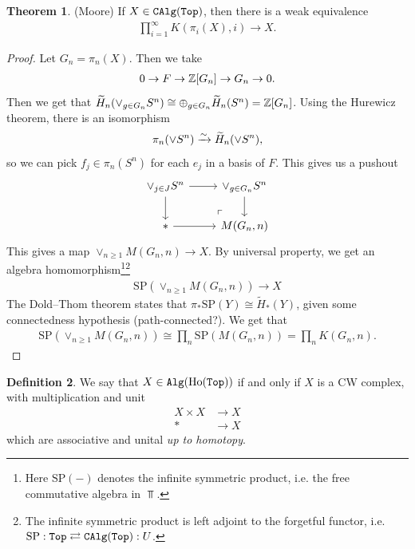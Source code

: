 \documentclass[12pt]{amsart}
\let\til\widetilde
\theoremstyle{definition}
\newtheorem{theorem}{Theorem}[section]
\newtheorem{definition}[theorem]{Definition}
\providecommand{\SP}{\text{SP}}
\begin{document}
\begin{theorem} (Moore) If $X\in\texttt{CAlg}(\texttt{Top})$, then there is a weak equivalence
\begin{align*}
    \prod_{i=1}^\infty K(\pi_i(X),i) \to X.
\end{align*}
\end{theorem}
\begin{proof} Let $G_n = \pi_n(X)$. Then we take
\begin{align*}
    0 \to F \to \mathbb{Z}[G_n] \to G_n \to 0.
\end{align*}
Then we get that $\til{H}_n(\vee_{g\in G_n}S^n) \cong \oplus_{g\in G_n} \til{H}_n(S^n) = \Z[G_n]$. Using the Hurewicz theorem, there is an isomorphism
\begin{align*}
    \pi_n(\vee S^n) \xto{\sim} \til{H}_n (\vee S^n),
\end{align*}
so we can pick $f_j \in \pi_n(S^n)$ for each $e_j$ in a basis of $F$. This gives us a pushout
\[ \begin{tikzcd}
    \vee_{j\in J} S^n\rar\dar & \vee_{g\in G_n}S^n\dar\\
    \ast\rar & M(G_n,n)\po
\end{tikzcd} \]
This gives a map $\vee_{n\ge 1} M(G_n,n) \to X$. By universal property, we get an algebra homomorphism\footnote{Here $\SP(-)$ denotes the infinite symmetric product, i.e. the free commutative algebra in $\Top$.}\footnote{The infinite symmetric product is left adjoint to the forgetful functor, i.e. $\SP: \Top \rightleftarrows \CAlg(\Top) : U$.}
\begin{align*}
    \SP(\vee_{n\ge 1} M(G_n,n)) \to X
\end{align*}
The Dold--Thom theorem states that $\pi_\ast \SP(Y) \cong \til{H}_\ast(Y)$, given some connectedness hypothesis (path-connected?). We get that
\begin{align*}
    \SP(\vee_{n\ge 1} M(G_n,n)) \cong \prod_n \SP(M(G_n,n)) = \prod_n K(G_n,n).
\end{align*}
\end{proof}


\begin{definition} We say that $X \in \texttt{Alg}(\text{Ho}(\texttt{Top}))$ if and only if $X$ is a CW complex, with multiplication and unit
\begin{align*}
    X \times X &\to X \\
    \ast &\to X
\end{align*}
which are associative and unital \textit{up to homotopy}.
\end{definition}
\end{document}
